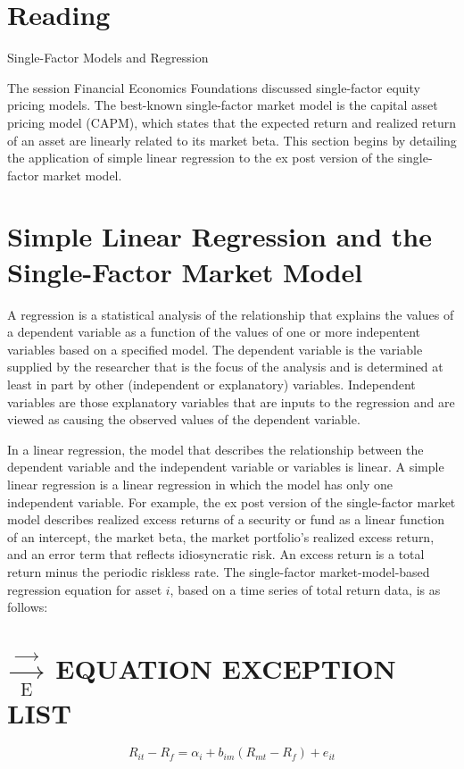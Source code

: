 \documentclass[11pt]{article}
\begin{document}
\section*{Reading}
Single-Factor Models and Regression

The session Financial Economics Foundations discussed single-factor equity pricing models. The best-known single-factor market model is the capital asset pricing model (CAPM), which states that the expected return and realized return of an asset are linearly related to its market beta. This section begins by detailing the application of simple linear regression to the ex post version of the single-factor market model.

\section*{Simple Linear Regression and the Single-Factor Market Model}
A regression is a statistical analysis of the relationship that explains the values of a dependent variable as a function of the values of one or more indepentent variables based on a specified model. The dependent variable is the variable supplied by the researcher that is the focus of the analysis and is determined at least in part by other (independent or explanatory) variables. Independent variables are those explanatory variables that are inputs to the regression and are viewed as causing the observed values of the dependent variable.

In a linear regression, the model that describes the relationship between the dependent variable and the independent variable or variables is linear. A simple linear regression is a linear regression in which the model has only one independent variable. For example, the ex post version of the single-factor market model describes realized excess returns of a security or fund as a linear function of an intercept, the market beta, the market portfolio's realized excess return, and an error term that reflects idiosyncratic risk. An excess return is a total return minus the periodic riskless rate. The single-factor market-model-based regression equation for asset $i$, based on a time series of total return data, is as follows:

\section*{$\xrightarrow[\text { E }]{\rightarrow}$ EQUATION EXCEPTION LIST}

\begin{equation*}
R_{i t}-R_{f}=\alpha_{i}+b_{i m}\left(R_{m t}-R_{f}\right)+e_{i t} \tag{1}
\end{equation*}
\end{document}
